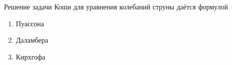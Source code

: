 Решение задачи Коши для уравнения колебаний струны даётся формулой

\begin{enumerate}[label=\arabic*)]
    \item Пуассона
    \item Даламбера
    \item Кирхгофа
\end{enumerate}


